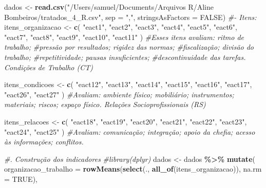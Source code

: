 \documentclass[
]{article}
\newenvironment{Shaded}{\begin{snugshade}}{\end{snugshade}}
\newcommand{\AttributeTok}[1]{\textcolor[rgb]{0.13,0.29,0.53}{#1}}
\newcommand{\CommentTok}[1]{\textcolor[rgb]{0.56,0.35,0.01}{\textit{#1}}}
\newcommand{\ConstantTok}[1]{\textcolor[rgb]{0.56,0.35,0.01}{#1}}
\newcommand{\FunctionTok}[1]{\textcolor[rgb]{0.13,0.29,0.53}{\textbf{#1}}}
\newcommand{\NormalTok}[1]{#1}
\newcommand{\OtherTok}[1]{\textcolor[rgb]{0.56,0.35,0.01}{#1}}
\newcommand{\SpecialCharTok}[1]{\textcolor[rgb]{0.81,0.36,0.00}{\textbf{#1}}}
\newcommand{\StringTok}[1]{\textcolor[rgb]{0.31,0.60,0.02}{#1}}
\begin{document}
\begin{Shaded}
\begin{Highlighting}[]
\NormalTok{dados }\OtherTok{\textless{}{-}} \FunctionTok{read.csv}\NormalTok{(}\StringTok{"/Users/samuel/Documents/Arquivos R/Aline Bombeiros/tratados\_4\_R.csv"}\NormalTok{,}
                  \AttributeTok{sep =} \StringTok{","}\NormalTok{,}
                  \AttributeTok{stringsAsFactors =} \ConstantTok{FALSE}\NormalTok{)}
\CommentTok{\#{-} Itens:}
\NormalTok{itens\_organizacao }\OtherTok{\textless{}{-}} \FunctionTok{c}\NormalTok{(}
    \StringTok{"eact1"}\NormalTok{,}
    \StringTok{"eact2"}\NormalTok{,}
    \StringTok{"eact3"}\NormalTok{,}
    \StringTok{"eact4"}\NormalTok{,}
    \StringTok{"eact5"}\NormalTok{,}
    \StringTok{"eact6"}\NormalTok{,}
    \StringTok{"eact7"}\NormalTok{,}
    \StringTok{"eact8"}\NormalTok{,}
    \StringTok{"eact9"}\NormalTok{,}
    \StringTok{"eact10"}\NormalTok{,}
    \StringTok{"eact11"}
\NormalTok{  ) }
\CommentTok{\#Esses itens avaliam: ritmo de trabalho;}
\CommentTok{\#pressão por resultados; rigidez das normas;}
\CommentTok{\#fiscalização; divisão do trabalho;}
\CommentTok{\#repetitividade; pausas insuficientes;}
\CommentTok{\#descontinuidade das tarefas. Condições de Trabalho (CT)}

\NormalTok{itens\_condicoes }\OtherTok{\textless{}{-}} \FunctionTok{c}\NormalTok{(}
  \StringTok{"eact12"}\NormalTok{,}
  \StringTok{"eact13"}\NormalTok{,}
  \StringTok{"eact14"}\NormalTok{,}
  \StringTok{"eact15"}\NormalTok{,}
  \StringTok{"eact16"}\NormalTok{,}
  \StringTok{"eact17"}\NormalTok{,}
  \StringTok{"eact26"}\NormalTok{,}
  \StringTok{"eact27"}
\NormalTok{) }\CommentTok{\#Avaliam: ambiente físico; mobiliário; instrumentos; materiais; riscos; espaço físico. Relações Socioprofissionais (RS)}

\NormalTok{itens\_relacoes }\OtherTok{\textless{}{-}} \FunctionTok{c}\NormalTok{(}
  \StringTok{"eact18"}\NormalTok{,}
  \StringTok{"eact19"}\NormalTok{,}
  \StringTok{"eact20"}\NormalTok{,}
  \StringTok{"eact21"}\NormalTok{,}
  \StringTok{"eact22"}\NormalTok{,}
  \StringTok{"eact23"}\NormalTok{,}
  \StringTok{"eact24"}\NormalTok{,}
  \StringTok{"eact25"}
\NormalTok{) }\CommentTok{\#Avaliam: comunicação; integração; apoio da chefia; acesso às informações;  conflitos.}

\CommentTok{\#. Construção dos indicadores}
\CommentTok{\#library(dplyr)}
\NormalTok{dados }\OtherTok{\textless{}{-}}\NormalTok{ dados }\SpecialCharTok{\%\textgreater{}\%}
  \FunctionTok{mutate}\NormalTok{(}
    \AttributeTok{organizacao\_trabalho =}
      \FunctionTok{rowMeans}\NormalTok{(}\FunctionTok{select}\NormalTok{(., }\FunctionTok{all\_of}\NormalTok{(itens\_organizacao)),}
               \AttributeTok{na.rm =} \ConstantTok{TRUE}\NormalTok{),}
    

\end{Highlighting}
\end{Shaded}
\end{document}

